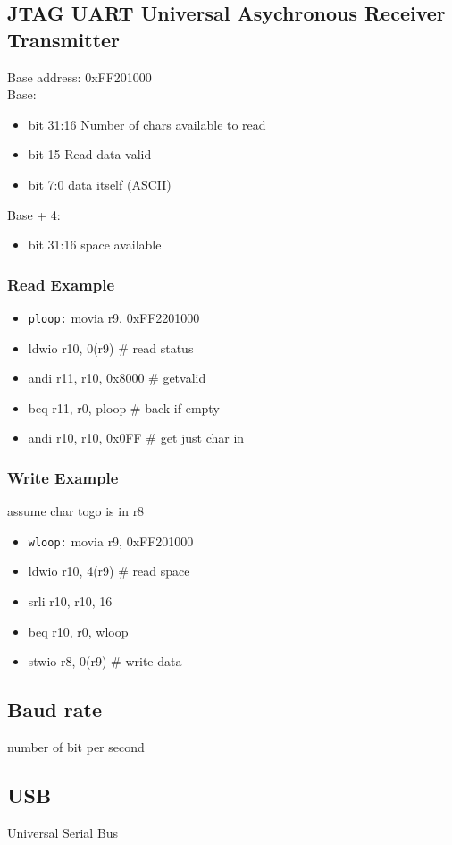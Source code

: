 \documentclass[11pt]{article}
\begin{document}
\subsection{JTAG UART Universal Asychronous Receiver Transmitter}
\label{sec:orgheadline68}
Base address: 0xFF201000 \\
Base:
\begin{itemize}
\item bit 31:16 Number of chars available to read
\item bit 15 Read data valid
\item bit 7:0 data itself (ASCII)
\end{itemize}
Base + 4:
\begin{itemize}
\item bit 31:16 space available
\end{itemize}

\subsubsection{Read Example}
\label{sec:orgheadline66}
\begin{itemize}
\item \texttt{ploop:} movia r9, 0xFF2201000
\item ldwio r10, 0(r9) \# read status
\item andi r11, r10, 0x8000 \# getvalid
\item beq r11, r0, ploop \# back if empty
\item andi r10, r10, 0x0FF \# get just char in
\end{itemize}
\subsubsection{Write Example}
\label{sec:orgheadline67}
assume char togo is in r8
\begin{itemize}
\item \texttt{wloop:} movia r9, 0xFF201000
\item ldwio r10, 4(r9) \# read space
\item srli r10, r10, 16
\item beq r10, r0, wloop
\item stwio r8, 0(r9) \# write data
\end{itemize}
\subsection{Baud rate}
\label{sec:orgheadline69}
number of bit per second
\subsection{USB}
\label{sec:orgheadline70}
Universal Serial Bus
\end{document}
